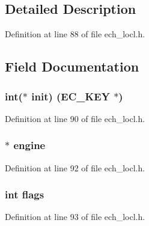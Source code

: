 \subsection{Detailed Description}


Definition at line 88 of file ech\+\_\+locl.\+h.



\subsection{Field Documentation}
\subsubsection[{\texorpdfstring{init}{init}}]{\setlength{\rightskip}{0pt plus 5cm}int($\ast$ init) ({\bf E\+C\+\_\+\+K\+EY} $\ast$)}\hypertarget{structecdh__data__st_abe4cc01385a304b13c23583b069cba3f}{}\label{structecdh__data__st_abe4cc01385a304b13c23583b069cba3f}


Definition at line 90 of file ech\+\_\+locl.\+h.

\subsubsection[{\texorpdfstring{engine}{engine}}]{$\ast$ engine}\hypertarget{structecdh__data__st_a4eb35fa252ec72ad7c53a4c8d30a7fd3}{}\label{structecdh__data__st_a4eb35fa252ec72ad7c53a4c8d30a7fd3}


Definition at line 92 of file ech\+\_\+locl.\+h.

\subsubsection[{\texorpdfstring{flags}{flags}}]{\setlength{\rightskip}{0pt plus 5cm}int flags}\hypertarget{structecdh__data__st_ac8bf36fe0577cba66bccda3a6f7e80a4}{}\label{structecdh__data__st_ac8bf36fe0577cba66bccda3a6f7e80a4}


Definition at line 93 of file ech\+\_\+locl.\+h.

